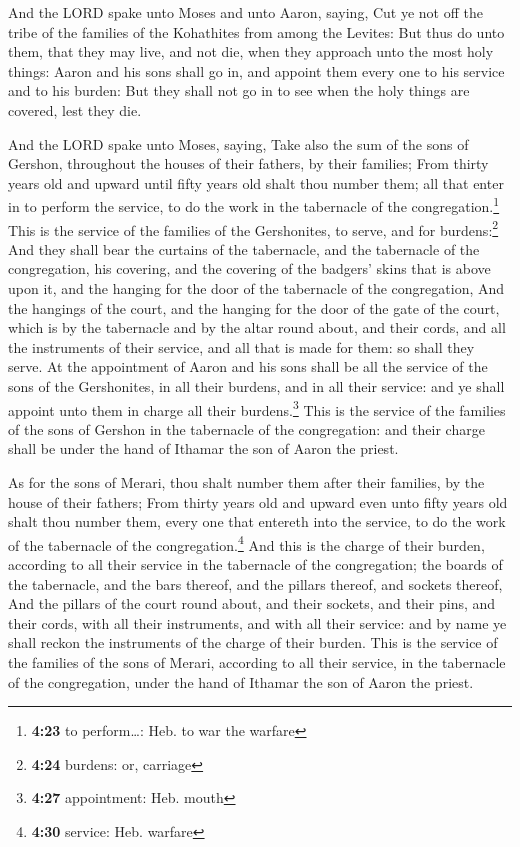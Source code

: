  And the LORD spake unto Moses and unto Aaron, saying,
 Cut ye not off the tribe of the families of the
Kohathites from among the Levites:  But thus do unto
them, that they may live, and not die, when they approach unto the most
holy things: Aaron and his sons shall go in, and appoint them every one
to his service and to his burden:  But they shall not go
in to see when the holy things are covered, lest they die.

 And the LORD spake unto Moses, saying, 
Take also the sum of the sons of Gershon, throughout the houses of their
fathers, by their families;  From thirty years old and
upward until fifty years old shalt thou number them; all that enter in
to perform the service, to do the work in the tabernacle of the
congregation.\footnote{\textbf{4:23} to perform\ldots: Heb. to war the
  warfare}  This is the service of the families of the
Gershonites, to serve, and for burdens:\footnote{\textbf{4:24} burdens:
  or, carriage}  And they shall bear the curtains of the
tabernacle, and the tabernacle of the congregation, his covering, and
the covering of the badgers' skins that is above upon it, and the
hanging for the door of the tabernacle of the congregation,
 And the hangings of the court, and the hanging for the
door of the gate of the court, which is by the tabernacle and by the
altar round about, and their cords, and all the instruments of their
service, and all that is made for them: so shall they serve.
 At the appointment of Aaron and his sons shall be all
the service of the sons of the Gershonites, in all their burdens, and in
all their service: and ye shall appoint unto them in charge all their
burdens.\footnote{\textbf{4:27} appointment: Heb. mouth} 
This is the service of the families of the sons of Gershon in the
tabernacle of the congregation: and their charge shall be under the hand
of Ithamar the son of Aaron the priest.

 As for the sons of Merari, thou shalt number them after
their families, by the house of their fathers;  From
thirty years old and upward even unto fifty years old shalt thou number
them, every one that entereth into the service, to do the work of the
tabernacle of the congregation.\footnote{\textbf{4:30} service: Heb.
  warfare}  And this is the charge of their burden,
according to all their service in the tabernacle of the congregation;
the boards of the tabernacle, and the bars thereof, and the pillars
thereof, and sockets thereof,  And the pillars of the
court round about, and their sockets, and their pins, and their cords,
with all their instruments, and with all their service: and by name ye
shall reckon the instruments of the charge of their burden.
 This is the service of the families of the sons of
Merari, according to all their service, in the tabernacle of the
congregation, under the hand of Ithamar the son of Aaron the priest.


